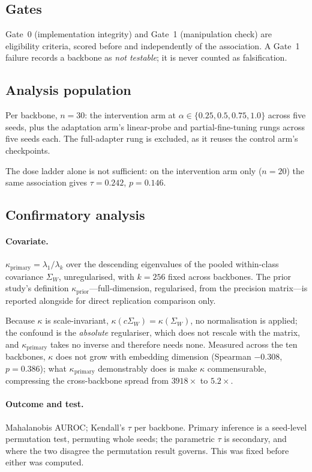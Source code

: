 \documentclass[11pt,a4paper]{article}
\newcommand{\kprim}{\ensuremath{\kappa_{\mathrm{primary}}}}
\newcommand{\kpfour}{\ensuremath{\kappa_{\mathrm{prior}}}}
\newcommand{\Sw}{\ensuremath{\Sigma_W}}
\begin{document}
\subsection{Gates}

Gate~0 (implementation integrity) and Gate~1 (manipulation check) are eligibility
criteria, scored before and independently of the association. A Gate~1 failure
records a backbone as \emph{not testable}; it is never counted as falsification.

\subsection{Analysis population}

Per backbone, $n = 30$: the intervention arm at
$\alpha \in \{0.25, 0.5, 0.75, 1.0\}$ across five seeds, plus the adaptation
arm's linear-probe and partial-fine-tuning rungs across five seeds each. The
full-adapter rung is excluded, as it reuses the control arm's checkpoints.

The dose ladder alone is not sufficient: on the intervention arm only ($n = 20$)
the same association gives $\tau = 0.242$, $p = 0.146$.

\subsection{Confirmatory analysis}

\paragraph{Covariate.} $\kprim = \lambda_1/\lambda_k$ over the descending
eigenvalues of the pooled within-class covariance \Sw, unregularised, with
$k = 256$ fixed across backbones. The prior study's definition
\kpfour---full-dimension, regularised, from the precision matrix---is reported
alongside for direct replication comparison only.

Because $\kappa$ is scale-invariant, $\kappa(c\Sw) = \kappa(\Sw)$, no
normalisation is applied; the confound is the \emph{absolute} regulariser, which
does not rescale with the matrix, and \kprim{} takes no inverse and therefore
needs none. Measured across the ten backbones, $\kappa$ does not grow with
embedding dimension (Spearman $-0.308$, $p = 0.386$); what \kprim{} demonstrably
does is make $\kappa$ commensurable, compressing the cross-backbone spread from
$3918\times$ to $5.2\times$.

\paragraph{Outcome and test.} Mahalanobis AUROC; Kendall's $\tau$ per backbone.
Primary inference is a seed-level permutation test, permuting whole seeds; the
parametric $\tau$ is secondary, and where the two disagree the permutation result
governs. This was fixed before either was computed.
\end{document}
